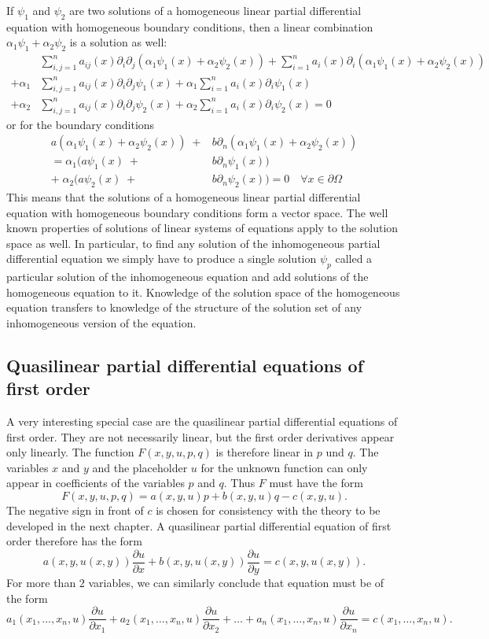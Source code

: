 If $\psi_1$ and $\psi_2$ are two solutions of a homogeneous linear partial
differential equation with homogeneous boundary conditions, then
a linear combination $\alpha_1\psi_1+\alpha_2\psi_2$ is a solution
as well:
\begin{align*}
&\sum_{i,j=1}^n a_{ij}(x)\partial_i \partial_j
(\alpha_1\psi_1(x)+\alpha_2\psi_2(x))
+\sum_{i=1}^na_i(x)\partial_i
(\alpha_1\psi_1(x)+\alpha_2\psi_2(x))
\\
+
\alpha_1
&\sum_{i,j=1}^n a_{ij}(x)\partial_i \partial_j
\psi_1(x)
+
\alpha_1
\sum_{i=1}^na_i(x)\partial_i
\psi_1(x)
\\
+
\alpha_2
&\sum_{i,j=1}^n a_{ij}(x)\partial_i \partial_j
\psi_2(x)
+
\alpha_2
\sum_{i=1}^na_i(x)\partial_i
\psi_2(x)
=0
\end{align*}
or for the boundary conditions
\begin{align*}
a(\alpha_1\psi_1(x) +\alpha_2\psi_2(x))
\;+&b\partial_n
(\alpha_1\psi_1(x) +\alpha_2\psi_2(x))\\
=\alpha_1(a\psi_1(x)
\;+&b\partial_n
\psi_1(x))\\
+\;\alpha_2(a\psi_2(x)
\;+&b\partial_n
\psi_2(x))
=0\quad\forall x\in\partial\Omega
\end{align*}
This means that the solutions of a homogeneous linear
partial differential equation with homogeneous boundary conditions
form a vector space.
The well known properties of solutions of linear systems of equations
apply to the solution space as well.
In particular, to find any solution of the inhomogeneous partial
differential equation we simply have to produce a single solution
$\psi_p$ called a particular solution of the inhomogeneous equation
and add solutions of the homogeneous equation to it.
Knowledge of the solution space of the homogeneous equation transfers
to knowledge of the structure of the solution set of any inhomogeneous
version of the equation.

\subsection{Quasilinear partial differential equations of first order
\label{klassifikation:quasilinear}}
A very interesting special case are the quasilinear partial differential
equations of first order.
They are not necessarily linear, but the first order derivatives appear only
linearly.
The function
$
F(x,y,u,p,q)
$
is therefore linear in $p$ und $q$.
The variables $x$ and $y$ and the placeholder $u$ for the unknown
function can only appear in coefficients of the variables $p$ and $q$.
Thus $F$ must have the form
\[
F(x,y,u,p,q)=a(x,y,u)p+b(x,y,u)q-c(x,y,u).
\]
The negative sign in front of $c$ is chosen for consistency with the
theory to be developed in the next chapter.
A quasilinear partial differential equation of first order therefore
has the form
\[
a(x,y,u(x,y))\frac{\partial u}{\partial x}+b(x,y,u(x,y))\frac{\partial u}{\partial y}
=c(x,y,u(x,y)).
\]
For more than $2$ variables, we can similarly conclude that equation must
be of the form
\[
a_1(x_1,\dots,x_n,u)\frac{\partial u}{\partial x_1}
+
a_2(x_1,\dots,x_n,u)\frac{\partial u}{\partial x_2}
+\dots
+
a_n(x_1,\dots,x_n,u)\frac{\partial u}{\partial x_n}
=c(x_1,\dots,x_n,u).
\]

